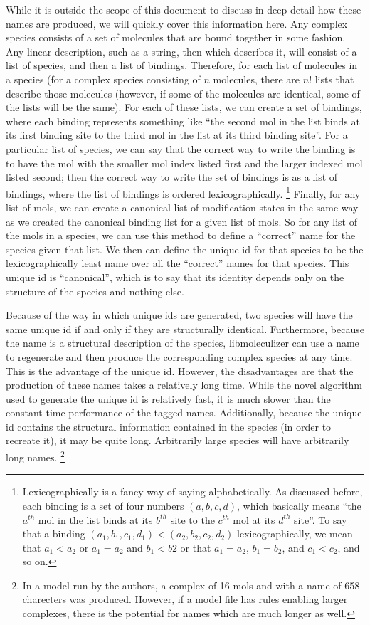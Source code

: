 While it is outside the scope of this document to discuss in deep
detail how these names are produced, we will quickly cover this
information here.  Any complex species consists of a set of molecules
that are bound together in some fashion.  Any linear description, such
as a string, then which describes it, will consist of a list of
species, and then a list of bindings.  Therefore, for each list of
molecules in a species (for a complex species consisting of $n$
molecules, there are $n!$ lists that describe those molecules
(however, if some of the molecules are identical, some of the lists
will be the same).  For each of these lists, we can create a set of
bindings, where each binding represents something like ``the second mol
in the list binds at its first binding site to the third mol in the
list at its third binding site''.  For a particular list of species,
we can say that the correct way to write the binding is to have the
mol with the smaller mol index listed first and the larger indexed mol
listed second; then the correct way to write the set of bindings is as
a list of bindings, where the list of bindings is ordered
lexicographically. \footnote{ Lexicographically is a fancy way of
  saying alphabetically.  As discussed before, each binding is a set
  of four numbers $(a,b,c,d)$, which basically means ``the $a^{th}$ mol in
  the list binds at its $b^{th}$ site to the $c^{th}$ mol at its
  $d^{th}$ site''.  To say that a binding $(a_1, b_1, c_1, d_1) <
  (a_2, b_2, c_2, d_2)$ lexicographically, we mean that $a_1 < a_2$ or
  $a_1 = a_2$ and $b_1 < b2$ or that $a_1 = a_2$, $b_1 = b_2$, and
  $c_1 < c_2$, and so on.} Finally, for any list of mols, we can
create a canonical list of modification states in the same way as we
created the canonical binding list for a given list of mols.  So for
any list of the mols in a species, we can use this method to define a
``correct'' name for the species given that list.  We then can define
the unique id for that species to be the lexicographically least name
over all the ``correct'' names for that species.  This unique id is
``canonical'', which is to say that its identity depends only on the
structure of the species and nothing else.  

Because of the way in which unique ids are generated, two species will
have the same unique id if and only if they are structurally
identical.  Furthermore, because the name is a structural description
of the species, libmoleculizer can use a name to regenerate and then
produce the corresponding complex species at any time.  This is the
advantage of the unique id.  However, the disadvantages are that the
production of these names takes a relatively long time.  While the
novel algorithm used to generate the unique id is relatively fast, it
is much slower than the constant time performance of the tagged
names.  Additionally, because the unique id contains the structural
information contained in the species (in order to recreate it), it may
be quite long.  Arbitrarily large species will have arbitrarily long
names.  \footnote{In a model run by the authors, a complex of 16 mols
  and with a name of 658 charecters was produced.  However, if a model
  file has rules enabling larger complexes, there is the potential for
  names which are much longer as well.}  

